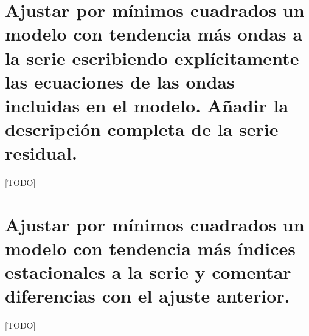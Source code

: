\documentclass[a4paper, spanish]{article}
\begin{document}
  \maketitle

  \section{Ajustar por mínimos cuadrados un modelo con tendencia más ondas a la serie escribiendo explícitamente las ecuaciones de las ondas incluidas en el modelo. Añadir la descripción completa de la serie residual.}

    \paragraph{}
    [TODO]

  \section{Ajustar por mínimos cuadrados un modelo con tendencia más índices estacionales a la serie y comentar diferencias con el ajuste anterior.}

    \paragraph{}
    [TODO]
\end{document}
